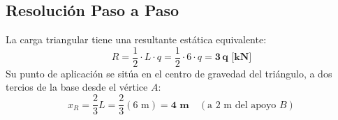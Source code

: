 \subsection{Resolución Paso a Paso}


La carga triangular tiene una resultante estática equivalente:
\begin{equation}
    R = \frac{1}{2} \cdot L \cdot q = \frac{1}{2} \cdot 6 \cdot q = \mathbf{3\,q\text{ [kN]}}
\end{equation}
Su punto de aplicación se sitúa en el centro de gravedad del triángulo, a dos tercios de la base desde el vértice $A$:
\begin{equation}
    x_R = \frac{2}{3} L = \frac{2}{3}(6\text{ m}) = \mathbf{4\text{ m}} \quad (\text{a } 2\text{ m del apoyo } B)
\end{equation}

